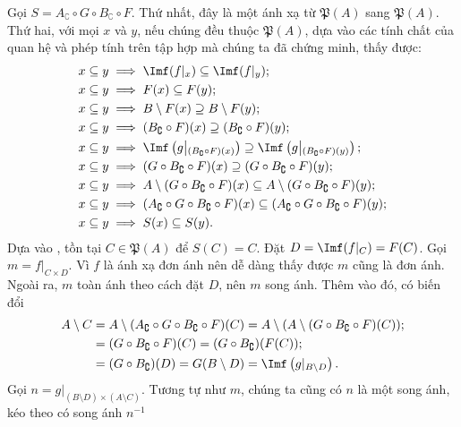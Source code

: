 Gọi $S = A_{\complement} \circ G \circ B_{\complement} \circ F$. Thứ nhất, đây là một ánh xạ từ $\mathfrak{P}(A)$ sang $\mathfrak{P}(A)$. Thứ hai, với mọi $x$ và $y$, nếu chúng đều thuộc $\mathfrak{P}(A)$, dựa vào các tính chất của quan hệ và phép tính trên tập hợp mà chúng ta đã chứng minh, thấy được:
\begin{align*}
   x \subseteq y &\implies \Imf(f|_x) \subseteq \Imf(f|_y); \\
   x \subseteq y &\implies F(x) \subseteq F(y); \\
   x \subseteq y &\implies B \setminus F(x) \supseteq B \setminus F(y); \\
   x \subseteq y &\implies (B_{\complement} \circ F)(x) \supseteq (B_{\complement} \circ F)(y); \\
   x \subseteq y &\implies \Imf\left(g\middle|_{(B_{\complement} \circ F)(x)}\right) \supseteq \Imf\left(g\middle|_{(B_{\complement} \circ F)(y)}\right); \\
   x \subseteq y &\implies (G \circ B_{\complement} \circ F)(x) \supseteq (
      G \circ B_{\complement} \circ F)(y);\\
   x \subseteq y &\implies A \setminus (G \circ B_{\complement} \circ F)(x) \subseteq A \setminus (G \circ B_{\complement} \circ F)(y); \\
   x \subseteq y &\implies (A_{\complement} \circ G \circ B_{\complement} \circ F)(x) \subseteq (A_{\complement} \circ G \circ B_{\complement} \circ F)(y); \\
   x \subseteq y &\implies S(x) \subseteq S(y).
\end{align*}
Dựa vào , tồn tại $C \in \mathfrak{P}(A)$ để $S(C) = C$. Đặt $D = \Imf(f|_C) = F(C)$. Gọi $m = f|_{C \times D}$. Vì $f$ là ánh xạ đơn ánh nên dễ dàng thấy được $m$ cũng là đơn ánh. Ngoài ra, $m$ toàn ánh theo cách đặt $D$, nên $m$ song ánh. Thêm vào đó, có biến đổi 
\begin{align*}
   A \setminus C &= A \setminus (A_{\complement} \circ G \circ B_{\complement} \circ F)(C) = A \setminus (A \setminus (G \circ B_{\complement} \circ F)(C)); \\
   &= (G \circ B_{\complement} \circ F)(C) = (G \circ B_{\complement})(F(C)); \\
   &= (G \circ B_{\complement})(D) = G(B \setminus D) = \Imf\left(g|_{B \setminus D}\right).
\end{align*}
Gọi $n = g|_{(B \setminus D) \times (A \setminus C)}$. Tương tự như $m$, chúng ta cũng có $n$ là một song ánh, kéo theo có song ánh $n^{-1}$

